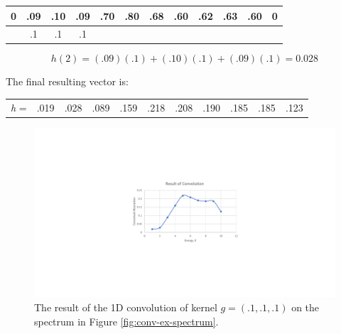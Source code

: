 \begin{table}[h!]
    \centering
    \begin{tabular}{|c|c|c|c|c|c|c|c|c|c|c|c|}
    \hline
    0 & .09 & .10 & .09 & .70 & \multicolumn{1}{c|}{.80} & \multicolumn{1}{c|}{.68} & \multicolumn{1}{c|}{.60} & .62 & .63 & .60 & 0 \\ \hline
      & .1  & .1  & .1  &     &                          &                          &                          &     &     &     &   \\ \hline
    \end{tabular}
\end{table}

$$ 
h(2) = (.09)(.1) + (.10)(.1) + (.09)(.1) = 0.028
$$

\noindent The final resulting vector is:

\begin{table}[h!]
    \centering
    \begin{tabular}{c|c|c|c|c|c|c|c|c|c|c|}
    \cline{2-11}
    \textit{h} = & .019 & .028 & .089 & .159 & .218 & .208 & .190 & .185 & .185 & .123 \\ \cline{2-11} 
    \end{tabular}
\end{table}

\begin{figure}[h!]
    \label{fig:conv-res-spectrum}
    \centering
    \includegraphics[width=.75\linewidth]{Chapters/Figures/conv-example-res.pdf}
    \caption[1D Convolution Result]{The result of the 1D convolution of kernel $ g = (.1, .1, .1) $  on the spectrum in Figure \ref{fig:conv-ex-spectrum}.}
\end{figure}

